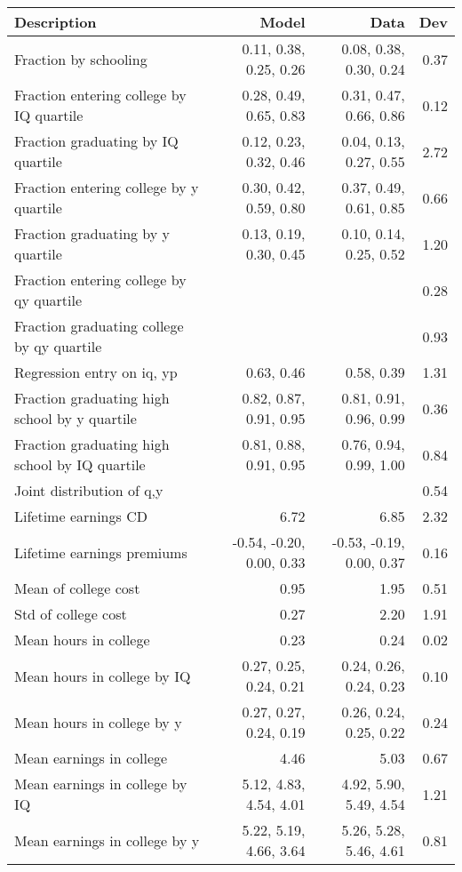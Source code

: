 \begin{tabular}{lrrr}
\hline
Description & Model  & Data  & Dev  \\ 
\hline
Fraction by schooling & 0.11, 0.38, 0.25, 0.26  & 0.08, 0.38, 0.30, 0.24  & 0.37  \\ 
Fraction entering college by IQ quartile & 0.28, 0.49, 0.65, 0.83  & 0.31, 0.47, 0.66, 0.86  & 0.12  \\ 
Fraction graduating by IQ quartile & 0.12, 0.23, 0.32, 0.46  & 0.04, 0.13, 0.27, 0.55  & 2.72  \\ 
Fraction entering college by y quartile & 0.30, 0.42, 0.59, 0.80  & 0.37, 0.49, 0.61, 0.85  & 0.66  \\ 
Fraction graduating by y quartile & 0.13, 0.19, 0.30, 0.45  & 0.10, 0.14, 0.25, 0.52  & 1.20  \\ 
Fraction entering college by qy quartile &   &   & 0.28  \\ 
Fraction graduating college by qy quartile &   &   & 0.93  \\ 
Regression entry on iq, yp & 0.63, 0.46  & 0.58, 0.39  & 1.31  \\ 
Fraction graduating high school by y quartile & 0.82, 0.87, 0.91, 0.95  & 0.81, 0.91, 0.96, 0.99  & 0.36  \\ 
Fraction graduating high school by IQ quartile & 0.81, 0.88, 0.91, 0.95  & 0.76, 0.94, 0.99, 1.00  & 0.84  \\ 
Joint distribution of q,y &   &   & 0.54  \\ 
Lifetime earnings CD & 6.72  & 6.85  & 2.32  \\ 
Lifetime earnings premiums & -0.54, -0.20, 0.00, 0.33  & -0.53, -0.19, 0.00, 0.37  & 0.16  \\ 
Mean of college cost & 0.95  & 1.95  & 0.51  \\ 
Std of college cost & 0.27  & 2.20  & 1.91  \\ 
Mean hours in college & 0.23  & 0.24  & 0.02  \\ 
Mean hours in college by IQ & 0.27, 0.25, 0.24, 0.21  & 0.24, 0.26, 0.24, 0.23  & 0.10  \\ 
Mean hours in college by y & 0.27, 0.27, 0.24, 0.19  & 0.26, 0.24, 0.25, 0.22  & 0.24  \\ 
Mean earnings in college & 4.46  & 5.03  & 0.67  \\ 
Mean earnings in college by IQ & 5.12, 4.83, 4.54, 4.01  & 4.92, 5.90, 5.49, 4.54  & 1.21  \\ 
Mean earnings in college by y & 5.22, 5.19, 4.66, 3.64  & 5.26, 5.28, 5.46, 4.61  & 0.81  \\ 

\end{tabular}
